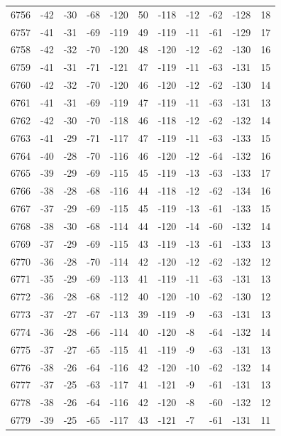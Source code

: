 \begin{table}[H]
\begin{tabular}{lllllllllll}
6756 & -42 & -30 & -68 & -120 & 50 & -118 & -12 & -62 & -128 & 18 \\
6757 & -41 & -31 & -69 & -119 & 49 & -119 & -11 & -61 & -129 & 17 \\
6758 & -42 & -32 & -70 & -120 & 48 & -120 & -12 & -62 & -130 & 16 \\
6759 & -41 & -31 & -71 & -121 & 47 & -119 & -11 & -63 & -131 & 15 \\
6760 & -42 & -32 & -70 & -120 & 46 & -120 & -12 & -62 & -130 & 14 \\
6761 & -41 & -31 & -69 & -119 & 47 & -119 & -11 & -63 & -131 & 13 \\
6762 & -42 & -30 & -70 & -118 & 46 & -118 & -12 & -62 & -132 & 14 \\
6763 & -41 & -29 & -71 & -117 & 47 & -119 & -11 & -63 & -133 & 15 \\
6764 & -40 & -28 & -70 & -116 & 46 & -120 & -12 & -64 & -132 & 16 \\
6765 & -39 & -29 & -69 & -115 & 45 & -119 & -13 & -63 & -133 & 17 \\
6766 & -38 & -28 & -68 & -116 & 44 & -118 & -12 & -62 & -134 & 16 \\
6767 & -37 & -29 & -69 & -115 & 45 & -119 & -13 & -61 & -133 & 15 \\
6768 & -38 & -30 & -68 & -114 & 44 & -120 & -14 & -60 & -132 & 14 \\
6769 & -37 & -29 & -69 & -115 & 43 & -119 & -13 & -61 & -133 & 13 \\
6770 & -36 & -28 & -70 & -114 & 42 & -120 & -12 & -62 & -132 & 12 \\
6771 & -35 & -29 & -69 & -113 & 41 & -119 & -11 & -63 & -131 & 13 \\
6772 & -36 & -28 & -68 & -112 & 40 & -120 & -10 & -62 & -130 & 12 \\
6773 & -37 & -27 & -67 & -113 & 39 & -119 & -9 & -63 & -131 & 13 \\
6774 & -36 & -28 & -66 & -114 & 40 & -120 & -8 & -64 & -132 & 14 \\
6775 & -37 & -27 & -65 & -115 & 41 & -119 & -9 & -63 & -131 & 13 \\
6776 & -38 & -26 & -64 & -116 & 42 & -120 & -10 & -62 & -132 & 14 \\
6777 & -37 & -25 & -63 & -117 & 41 & -121 & -9 & -61 & -131 & 13 \\
6778 & -38 & -26 & -64 & -116 & 42 & -120 & -8 & -60 & -132 & 12 \\
6779 & -39 & -25 & -65 & -117 & 43 & -121 & -7 & -61 & -131 & 11 \\

\end{tabular}
\end{table}
